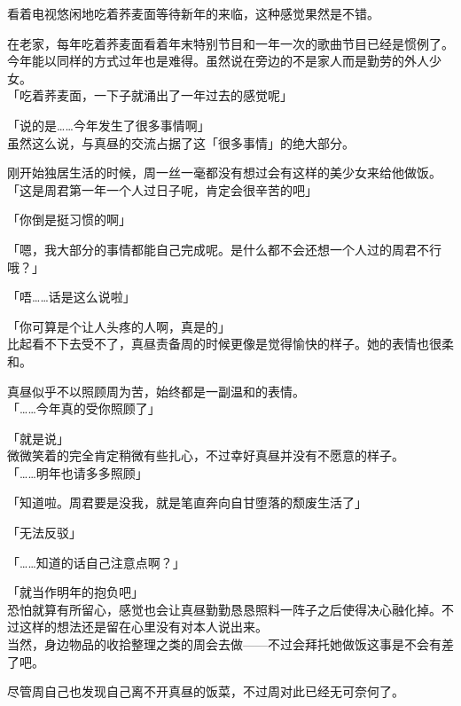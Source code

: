 看着电视悠闲地吃着荞麦面等待新年的来临，这种感觉果然是不错。

在老家，每年吃着荞麦面看着年末特别节目和一年一次的歌曲节目已经是惯例了。今年能以同样的方式过年也是难得。虽然说在旁边的不是家人而是勤劳的外人少女。\\

「吃着荞麦面，一下子就涌出了一年过去的感觉呢」

「说的是……今年发生了很多事情啊」\\

虽然这么说，与真昼的交流占据了这「很多事情」的绝大部分。

刚开始独居生活的时候，周一丝一毫都没有想过会有这样的美少女来给他做饭。\\

「这是周君第一年一个人过日子呢，肯定会很辛苦的吧」

「你倒是挺习惯的啊」

「嗯，我大部分的事情都能自己完成呢。是什么都不会还想一个人过的周君不行哦？」

「唔……话是这么说啦」

「你可算是个让人头疼的人啊，真是的」\\

比起看不下去受不了，真昼责备周的时候更像是觉得愉快的样子。她的表情也很柔和。

真昼似乎不以照顾周为苦，始终都是一副温和的表情。\\

「……今年真的受你照顾了」

「就是说」\\

微微笑着的完全肯定稍微有些扎心，不过幸好真昼并没有不愿意的样子。\\

「……明年也请多多照顾」

「知道啦。周君要是没我，就是笔直奔向自甘堕落的颓废生活了」

「无法反驳」

「……知道的话自己注意点啊？」

「就当作明年的抱负吧」\\

恐怕就算有所留心，感觉也会让真昼勤勤恳恳照料一阵子之后使得决心融化掉。不过这样的想法还是留在心里没有对本人说出来。\\

当然，身边物品的收拾整理之类的周会去做——不过会拜托她做饭这事是不会有差了吧。

尽管周自己也发现自己离不开真昼的饭菜，不过周对此已经无可奈何了。\\

